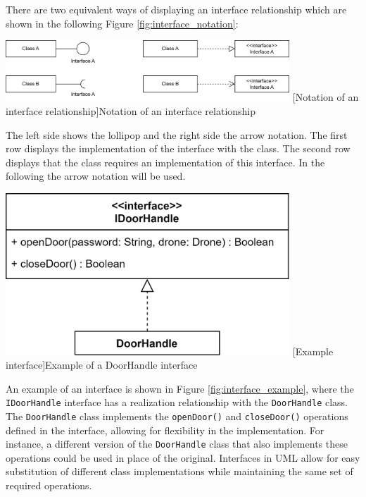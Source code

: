 \documentclass[
	12pt,
    a4paper,
    egregdoesnotlikesansseriftitles, %
    toc=chapterentrywithdots,
    oneside, openany,
    titlepage,
    parskip=half,
    headings=normal,  %
    listof=totoc,
    bibliography=totoc,
    index=totoc,
    captions=tableheading,  %
    listof=flat,
    numbers=noenddot, %
    final]
    {scrbook}
\begin{document}
There are two equivalent ways of displaying an interface relationship which are shown in the following Figure \ref{fig:interface_notation}:

\vspace{1em}
\begin{minipage}{\linewidth}
	\centering
	\includegraphics[width=0.8\textwidth]{figures/interface/Interface_Notation.jpg}
	[Notation of an interface relationship]{Notation of an interface relationship}
	\label{fig:interface_notation}
\end{minipage}
\vspace{1em}

The left side shows the lollipop and the right side the arrow notation.
The first row displays the implementation of the interface with the class.
The second row displays that the class requires an implementation of this interface. \cite[p. 129]{uml}
In the following the arrow notation will be used.
                

\vspace{1em}
\begin{minipage}{\linewidth}
	\centering
	\includegraphics[width=0.8\textwidth]{figures/interface/doorhandle_interface.jpg}
	[Example interface]{Example of a DoorHandle interface}
	\label{fig:interface_example}
\end{minipage}
\vspace{1em}


An example of an interface is shown in Figure \ref{fig:interface_example}, where the \texttt{IDoorHandle} interface has a realization relationship with the \texttt{DoorHandle} class.
The \texttt{DoorHandle} class implements the \texttt{openDoor()} and \texttt{closeDoor()} operations defined in the interface, allowing for flexibility in the implementation.
For instance, a different version of the \texttt{DoorHandle} class that also implements these operations could be used in place of the original.
Interfaces in UML allow for easy substitution of different class implementations while maintaining the same set of required operations.
\end{document}
